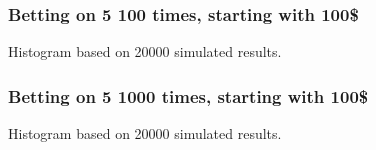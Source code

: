 \documentclass[handout]{beamer}
\begin{document}
   \begin{frame}
   \frametitle{Betting on {\color{red} 5} 100 times, starting with 100\$}
   \begin{center}
   \end{center}
   Histogram based on 20000 simulated results.
   \end{frame}



   \begin{frame}
   \frametitle{Betting on {\color{red} 5} 1000 times, starting with 100\$}
   \begin{center}
   \end{center}
   Histogram based on 20000 simulated results.
   \end{frame}


   \begin{frame} 

   \end{frame}

   
\end{document}

